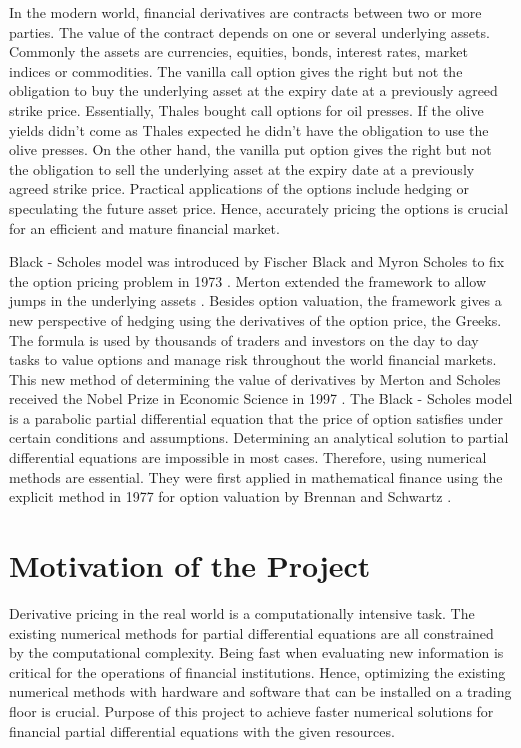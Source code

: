 \documentclass[12pt, oneside]{book}
\theoremstyle{plain}
\theoremstyle{definition}
\begin{document}
In the modern world, financial derivatives are contracts between two or more parties. The value of the contract depends on one or several underlying assets. Commonly the assets are currencies, equities, bonds, interest rates, market indices or commodities. The vanilla call option gives the right but not the obligation to buy the underlying asset at the expiry date at a previously agreed strike price. Essentially, Thales bought call options for oil presses.  If the olive yields didn't come as Thales expected he didn't have the obligation to use the olive presses.  On the other hand, the vanilla put option gives the right but not the obligation to sell the underlying asset at the expiry date at a previously agreed strike price. Practical applications of the options include hedging or speculating the future asset price. Hence, accurately pricing the options is crucial for an efficient and mature financial market. 

Black - Scholes model was introduced by Fischer Black and Myron Scholes to fix the option pricing problem in 1973 \cite{BS}. Merton extended the framework to allow jumps in the underlying assets \cite{merton}. Besides option valuation, the framework gives a new perspective of hedging using the derivatives of the option price, the Greeks. The formula is used by thousands of traders and investors on the day to day tasks to value options and manage risk throughout the world financial markets. This new method of determining the value of derivatives by Merton and Scholes received the Nobel Prize in Economic Science in 1997 \cite{nobel}. The Black - Scholes model is a parabolic partial differential equation that the price of option satisfies under certain conditions and assumptions. Determining an analytical solution to partial differential equations are impossible in most cases. Therefore, using numerical methods are essential. They were first applied in mathematical finance using the explicit method in 1977 for option valuation by Brennan and Schwartz \cite{firstFDM}.

\section{Motivation of the Project}
Derivative pricing in the real world is a computationally intensive task. The existing numerical methods for partial differential equations are all constrained by the computational complexity. Being fast when evaluating new information is critical for the operations of financial institutions. Hence, optimizing the existing numerical methods with hardware and software that can be installed on a trading floor is crucial. Purpose of this project to achieve faster numerical solutions for financial partial differential equations with the given resources. 
\end{document}
